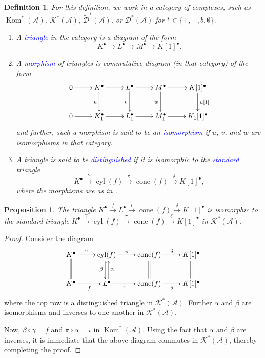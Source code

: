 \documentclass[11pt]{article}
\theoremstyle{thmstyle}
\newtheorem{proposition}[theorem]{Proposition}
\theoremstyle{defstyle}
\newtheorem{definition}[theorem]{Definition}
\newcommand{\scrA}{\mathscr{A}}
\newcommand{\scrD}{\mathscr{D}}
\newcommand{\wt}[1]{\widetilde{#1}}
\newcommand{\define}[1]{\textcolor{blue}{\textit{#1}}}
\newcommand{\Kom}{\operatorname{Kom}}
\newcommand{\scrK}{\mathscr{K}}
\newcommand{\cone}{\operatorname{cone}}
\newcommand{\cyl}{\operatorname{cyl}}
\begin{document}
\begin{definition}
	For this definition, we work in a category of complexes, such as $\Kom^\ast(\scrA)$, $\scrK^\ast(\scrA)$, $\wt\scrD^\ast(\scrA)$, or $\scrD^\ast(\scrA)$ for $\ast\in\{+, -, b, \emptyset\}$.
	\begin{enumerate}[label=(\arabic*)]
		\item A \define{triangle} in the category is a diagram of the form 
		\begin{equation*}
			K^\bullet\to L^\bullet\to M^\bullet\to K[1]^\bullet.
		\end{equation*}
		\item A \define{morphism} of triangles is commutative diagram (in that category) of the form 
		\begin{equation*}
			\xymatrix {
				0\ar[r] & K^\bullet\ar[r]\ar[d]_u & L^\bullet\ar[r]\ar[d]_v & M^\bullet\ar[r]\ar[d]_w & K[1]^\bullet\ar[d]^{u[1]}\\
				0\ar[r] & K_1^\bullet\ar[r] & L_1^\bullet\ar[r] & M_1^\bullet\ar[r] & K_1[1]^\bullet\\
			}
		\end{equation*}
		and further, such a morphism is said to be an \define{isomorphism} if $u$, $v$, and $w$ are isomorphisms in that category. 
		\item A triangle is said to be \define{distinguished} if it is isomorphic to the \define{standard} triangle 
		\begin{equation*}
			K^\bullet\xrightarrow{\gamma}\cyl(f)\xrightarrow{\pi}\cone(f)\xrightarrow{\delta} K[1]^\bullet,
		\end{equation*}
		where the morphisms are as in .
	\end{enumerate}
\end{definition}

\begin{proposition}
	The triangle $K^\bullet\xrightarrow{f} L^\bullet\xrightarrow{\iota}\cone(f)\xrightarrow{\delta} K[1]^\bullet$ is isomorphic to the standard triangle $K^\bullet\xrightarrow{\gamma}\cyl(f)\xrightarrow{\pi}\cone(f)\xrightarrow{\delta} K[1]^\bullet$ in $\scrK^\ast(\scrA)$.
\end{proposition}
\begin{proof}
	Consider the diagram 
	\begin{equation*}
		\xymatrix {
			K^\bullet\ar[r]^-{\gamma}\ar@{=}[d] & \cyl(f)\ar[r]^-{\pi}\ar@<-0.5ex>[d]_\beta & \cone(f)\ar[r]^-{\delta}\ar@{=}[d] & K[1]^\bullet\ar@{=}[d]\\
			K^\bullet\ar[r]_-{f} & L^\bullet\ar[r]_-{\iota}\ar@<-0.5ex>[u]_\alpha & \cone(f)\ar[r]_-{\delta} & K[1]^\bullet
		}
	\end{equation*}
	where the top row is a distinguished triangle in $\scrK^\ast(\scrA)$. Further $\alpha$ and $\beta$ are isomorphisms and inverses to one another in $\scrK^\ast(\scrA)$. 

	Now, $\beta\circ\gamma = f$ and $\pi\circ\alpha = \iota$ in $\Kom^\ast(\scrA)$. Using the fact that $\alpha$ and $\beta$ are inverses, it is immediate that the above diagram commutes in $\scrK^\ast(\scrA)$, thereby completing the proof.
\end{proof}
\end{document}
